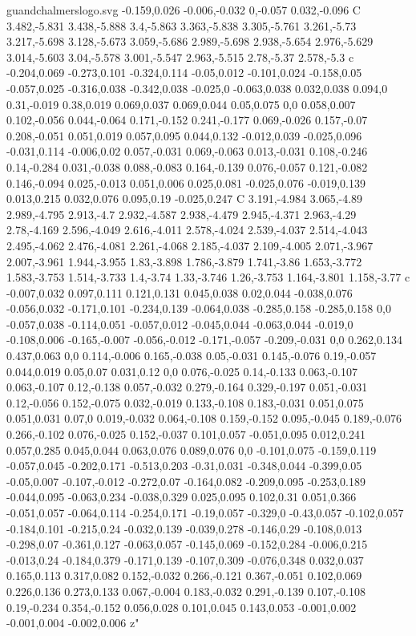 \begin{filecontents}[noheader]{guandchalmerslogo.svg}
-0.159,0.026 -0.006,-0.032 0,-0.057 0.032,-0.096 C 3.482,-5.831 3.438,-5.888 3.4,-5.863 3.363,-5.838 3.305,-5.761 3.261,-5.73 3.217,-5.698 3.128,-5.673 3.059,-5.686 2.989,-5.698 2.938,-5.654 2.976,-5.629 3.014,-5.603 3.04,-5.578 3.001,-5.547 2.963,-5.515 2.78,-5.37 2.578,-5.3 c -0.204,0.069 -0.273,0.101 -0.324,0.114 -0.05,0.012 -0.101,0.024 -0.158,0.05 -0.057,0.025 -0.316,0.038 -0.342,0.038 -0.025,0 -0.063,0.038 0.032,0.038 0.094,0 0.31,-0.019 0.38,0.019 0.069,0.037 0.069,0.044 0.05,0.075 0,0 0.058,0.007 0.102,-0.056 0.044,-0.064 0.171,-0.152 0.241,-0.177 0.069,-0.026 0.157,-0.07 0.208,-0.051 0.051,0.019 0.057,0.095 0.044,0.132 -0.012,0.039 -0.025,0.096 -0.031,0.114 -0.006,0.02 0.057,-0.031 0.069,-0.063 0.013,-0.031 0.108,-0.246 0.14,-0.284 0.031,-0.038 0.088,-0.083 0.164,-0.139 0.076,-0.057 0.121,-0.082 0.146,-0.094 0.025,-0.013 0.051,0.006 0.025,0.081 -0.025,0.076 -0.019,0.139 0.013,0.215 0.032,0.076 0.095,0.19 -0.025,0.247 C 3.191,-4.984 3.065,-4.89 2.989,-4.795 2.913,-4.7 2.932,-4.587 2.938,-4.479 2.945,-4.371 2.963,-4.29 2.78,-4.169 2.596,-4.049 2.616,-4.011 2.578,-4.024 2.539,-4.037 2.514,-4.043 2.495,-4.062 2.476,-4.081 2.261,-4.068 2.185,-4.037 2.109,-4.005 2.071,-3.967 2.007,-3.961 1.944,-3.955 1.83,-3.898 1.786,-3.879 1.741,-3.86 1.653,-3.772 1.583,-3.753 1.514,-3.733 1.4,-3.74 1.33,-3.746 1.26,-3.753 1.164,-3.801 1.158,-3.77 c -0.007,0.032 0.097,0.111 0.121,0.131 0.045,0.038 0.02,0.044 -0.038,0.076 -0.056,0.032 -0.171,0.101 -0.234,0.139 -0.064,0.038 -0.285,0.158 -0.285,0.158 0,0 -0.057,0.038 -0.114,0.051 -0.057,0.012 -0.045,0.044 -0.063,0.044 -0.019,0 -0.108,0.006 -0.165,-0.007 -0.056,-0.012 -0.171,-0.057 -0.209,-0.031 0,0 0.262,0.134 0.437,0.063 0,0 0.114,-0.006 0.165,-0.038 0.05,-0.031 0.145,-0.076 0.19,-0.057 0.044,0.019 0.05,0.07 0.031,0.12 0,0 0.076,-0.025 0.14,-0.133 0.063,-0.107 0.063,-0.107 0.12,-0.138 0.057,-0.032 0.279,-0.164 0.329,-0.197 0.051,-0.031 0.12,-0.056 0.152,-0.075 0.032,-0.019 0.133,-0.108 0.183,-0.031 0.051,0.075 0.051,0.031 0.07,0 0.019,-0.032 0.064,-0.108 0.159,-0.152 0.095,-0.045 0.189,-0.076 0.266,-0.102 0.076,-0.025 0.152,-0.037 0.101,0.057 -0.051,0.095 0.012,0.241 0.057,0.285 0.045,0.044 0.063,0.076 0.089,0.076 0,0 -0.101,0.075 -0.159,0.119 -0.057,0.045 -0.202,0.171 -0.513,0.203 -0.31,0.031 -0.348,0.044 -0.399,0.05 -0.05,0.007 -0.107,-0.012 -0.272,0.07 -0.164,0.082 -0.209,0.095 -0.253,0.189 -0.044,0.095 -0.063,0.234 -0.038,0.329 0.025,0.095 0.102,0.31 0.051,0.366 -0.051,0.057 -0.064,0.114 -0.254,0.171 -0.19,0.057 -0.329,0 -0.43,0.057 -0.102,0.057 -0.184,0.101 -0.215,0.24 -0.032,0.139 -0.039,0.278 -0.146,0.29 -0.108,0.013 -0.298,0.07 -0.361,0.127 -0.063,0.057 -0.145,0.069 -0.152,0.284 -0.006,0.215 -0.013,0.24 -0.184,0.379 -0.171,0.139 -0.107,0.309 -0.076,0.348 0.032,0.037 0.165,0.113 0.317,0.082 0.152,-0.032 0.266,-0.121 0.367,-0.051 0.102,0.069 0.226,0.136 0.273,0.133 0.067,-0.004 0.183,-0.032 0.291,-0.139 0.107,-0.108 0.19,-0.234 0.354,-0.152 0.056,0.028 0.101,0.045 0.143,0.053 -0.001,0.002 -0.001,0.004 -0.002,0.006 z"

\end{filecontents}
